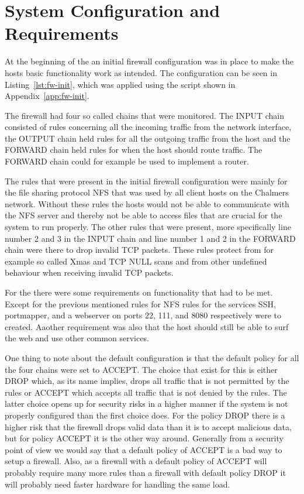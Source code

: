 \section{System Configuration and Requirements}
\label{sec:setup}

At the beginning of the \lab{} an initial firewall configuration was in place to make the hosts basic functionality work as intended. The configuration can be seen in Listing~\ref{lst:fw-init}, which was applied using the script shown in Appendix~\ref{app:fw-init}. 

The firewall had four so called chains that were monitored. The INPUT chain consisted of rules concerning all the incoming traffic from the network interface, the OUTPUT chain held rules for all the outgoing traffic from the host and the FORWARD chain held rules for when the host should route traffic. The FORWARD chain could for example be used to implement a router.

The rules that were present in the initial firewall configuration were mainly for the file sharing protocol NFS that was used by all client hosts on the Chalmers network. Without these rules the hosts would not be able to communicate with the NFS server and thereby not be able to access files that are crucial for the system to run properly. The other rules that were present, more specifically line number 2 and 3 in the INPUT chain and line number 1 and 2 in the FORWARD chain were there to drop invalid TCP packets. These rules protect from for example so called Xmas and TCP NULL scans and from other undefined behaviour when receiving invalid TCP packets.

For the \lab{} there were some requirements on functionality that had to be met. Except for the previous mentioned rules for NFS rules for the services SSH, portmapper, and a webserver on ports 22, 111, and 8080 respectively were to created. Aaother requirement was also that the host should still be able to surf the web and use other common services. 

One thing to note about the default configuration is that the default policy for all the four chains were set to ACCEPT. The choice that exist for this is either DROP which, as its name implies, drops all traffic that is not permitted by the rules or ACCEPT which accepts all traffic that is not denied by the rules. The latter choice opens up for security risks in a higher manner if the system is not properly configured than the first choice does. For the policy DROP there is a higher risk that the firewall drops valid data than it is to accept malicious data, but for policy ACCEPT it is the other way around. Generally from a security point of view we would say that a default policy of ACCEPT is a bad way to setup a firewall. Also, as a firewall with a default policy of ACCEPT will probably require many more rules than a firewall with default policy DROP it will probably need faster hardware for handling the same load.

\newpage
